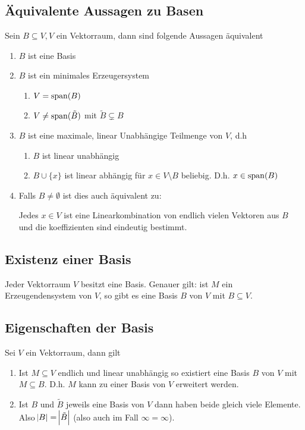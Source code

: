\subsection{Äquivalente Aussagen zu Basen}
Sein $B \subseteq V, V$ ein Vektorraum, dann sind folgende Aussagen äquivalent
\begin{enumerate}
    \item $B$ ist eine Basis
    \item $B$ ist ein minimales Erzeugersystem
        \begin{enumerate}
            \item $V = \operatorname{span}(B)$
            \item $V \neq \operatorname{span}(\tilde{B})$ mit $\tilde{B} \subsetneq B$
        \end{enumerate}
    \item $B$ ist eine maximale, linear Unabhängige Teilmenge von $V$, d.h
        \begin{enumerate}
            \item $B$ ist linear unabhängig
            \item $B \cup \{ x \}$ ist linear abhängig für $x \in V \setminus B$
                beliebig. D.h. $x \in \operatorname{span}(B)$
        \end{enumerate}
    \item Falls $B \neq \emptyset$ ist dies auch äquivalent zu:

        Jedes $x \in V$ ist eine Linearkombination von endlich vielen Vektoren
        aus $B$ und die koeffizienten sind eindeutig bestimmt.
\end{enumerate}

\subsection{Existenz einer Basis}
Jeder Vektorraum $V$ besitzt eine Basis. Genauer gilt: ist $M$ ein
Erzeugendensystem von $V$, so gibt es eine Basis $B$ von $V$ mit
$B \subseteq V$.

\subsection{Eigenschaften der Basis}
Sei $V$ ein Vektorraum, dann gilt
\begin{enumerate}
    \item Ist $M \subseteq V$ endlich und linear unabhängig so existiert eine
        Basis $B$ von $V$ mit $M \subseteq B$. D.h. $M$ kann zu einer Basis von
        $V$ erweitert werden.
    \item Ist $B$ und $\tilde{B}$ jeweils eine Basis von $V$ dann haben beide
        gleich viele Elemente. Also $\abs{B} = \abs{\tilde{B}}$ (also auch im
        Fall $\infty = \infty$).
\end{enumerate}

